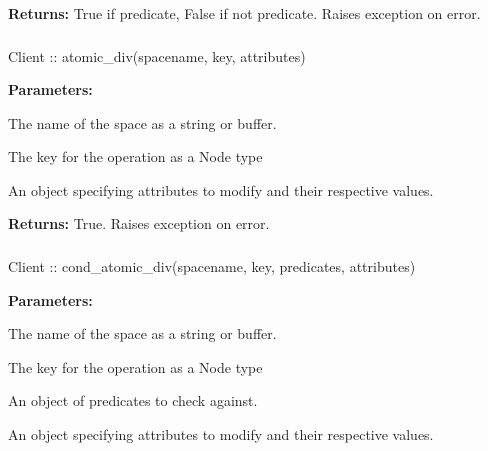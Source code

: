 \noindent\textbf{Returns:}
True if predicate, False if not predicate.  Raises exception on error.

\subsubsection{}
\label{api:nodejs:atomic_div}
\begin{javascriptcode}
Client :: atomic_div(spacename, key, attributes)
\end{javascriptcode}
\funcdesc 

\noindent\textbf{Parameters:}
\begin{description}[labelindent=\widthof{{\code{attributes}}},leftmargin=*,noitemsep,nolistsep,align=right]
\item[\code{spacename}] The name of the space as a string or buffer.
\item[\code{key}] The key for the operation as a Node type
\item[\code{attributes}] An object specifying attributes to modify and their respective values.
\end{description}

\noindent\textbf{Returns:}
True.  Raises exception on error.

\subsubsection{}
\label{api:nodejs:cond_atomic_div}
\begin{javascriptcode}
Client :: cond_atomic_div(spacename, key, predicates, attributes)
\end{javascriptcode}
\funcdesc 

\noindent\textbf{Parameters:}
\begin{description}[labelindent=\widthof{{\code{predicates}}},leftmargin=*,noitemsep,nolistsep,align=right]
\item[\code{spacename}] The name of the space as a string or buffer.
\item[\code{key}] The key for the operation as a Node type
\item[\code{predicates}] An object of predicates to check against.
\item[\code{attributes}] An object specifying attributes to modify and their respective values.
\end{description}

